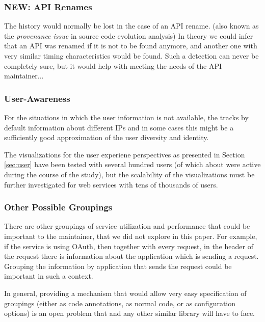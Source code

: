 \documentclass[conference]{IEEEtran}
\begin{document}
  \subsubsection{NEW: API Renames}


    The history would normally be lost in the case of an API rename. (also known as the {\em provenance issue} in source code evolution analysis)
    In theory we could infer that an API was renamed if it is not to be found anymore, and another one with very similar timing characteristics would be found. Such a detection can never be completely sure, but it would help with meeting the needs of the API maintainer... 

  \subsubsection{User-Awareness }

    For the situations in which the user information is not available, the \tool tracks by default information about different IPs and in some cases this might be a sufficiently good approximation of the user diversity and identity. 

    The visualizations for the user experiene perspectives as presented in Section \ref{sec:user} have been tested with several hundred users (of which about \activeUserCount were active during the course of the study), but the scalability of the visualizations must be further investigated for web services with tens of thousands of users.


  \subsubsection{Other Possible Groupings}

    There are other groupings of service utilization and performance that could be important to the maintainer, that we did not explore in this paper. For example, if the service is using OAuth, then together with every request, in the header of the request there is information about the application which is sending a request. Grouping the information by application that sends the request could be important in such a context. 

    In general, providing a mechanism that would allow very easy specification of groupings (either as code annotations, as normal code, or as configuration options) is an open problem that \tool and any other similar library will have to face.
\end{document}
